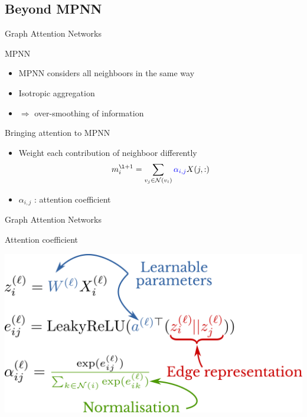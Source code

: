 \documentclass[11pt]{beamer}
\begin{document}


\subsection{Beyond MPNN}
\begin{frame}{Graph Attention Networks}
  \begin{block}{MPNN }
    \begin{itemize}
    \item MPNN considers all neighboors in the same way
    \item Isotropic aggregation
    \item $\Rightarrow$ over-smoothing of information
    \end{itemize}
  \end{block}
  \begin{block}{Bringing attention to MPNN}
    \begin{itemize}
    \item Weight each contribution of neighboor differently
     $$m_i^{\l+1} = \sum_{v_j \in \mathcal{N}(v_i)}\emph{
       \alpha_{i,j}} X(j,:)$$
     
   \item $\alpha_{i,j}$ : attention coefficient
    \end{itemize}
    
  \end{block}
\end{frame}

\begin{frame}{Graph Attention Networks}
  \begin{block}{Attention coefficient} 
    \begin{center}
      \includegraphics[width=.8\textwidth]{gat}
    \end{center}
  \end{block}
  
\end{frame}
\end{document}
